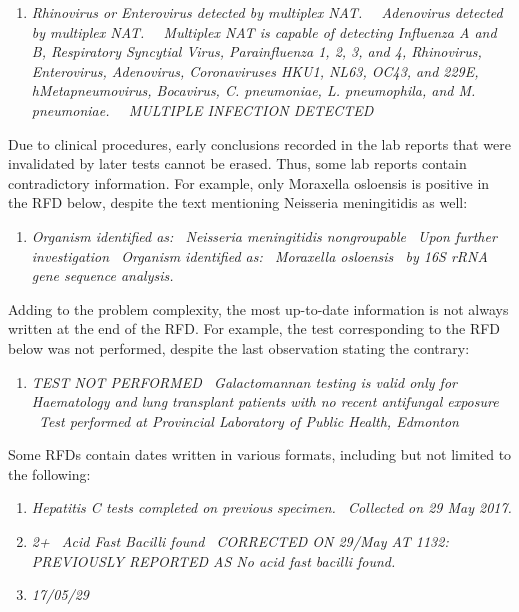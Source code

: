\documentclass[sigconf]{acmart}
\begin{document}
\begin{enumerate}[resume]
    \item \textit{Rhinovirus or Enterovirus detected by multiplex NAT. \textbar\ \textbar\ Adenovirus detected by multiplex NAT. \textbar\ \textbar\ Multiplex NAT is capable of detecting Influenza A and B, Respiratory Syncytial Virus, Parainfluenza 1, 2, 3, and 4, Rhinovirus, Enterovirus, Adenovirus, Coronaviruses HKU1, NL63, OC43, and 229E, hMetapneumovirus, Bocavirus, C. pneumoniae, L. pneumophila, and M. pneumoniae. \textbar\ \textbar\ MULTIPLE INFECTION DETECTED}
\end{enumerate}

Due to clinical procedures, early conclusions recorded in the lab reports that were invalidated by later tests cannot be erased. Thus, some lab reports contain contradictory information. For example, only Moraxella osloensis is positive in the RFD below, despite the text mentioning Neisseria meningitidis as well:

\begin{enumerate}[resume]
    \item \textit{Organism identified as: \textbar\ Neisseria meningitidis nongroupable \textbar\ Upon further investigation \textbar\ Organism identified as: \textbar\ Moraxella osloensis \textbar\ by 16S rRNA gene sequence analysis.}
\end{enumerate}

Adding to the problem complexity, the most up-to-date information is not always written at the end of the RFD. For example, the test corresponding to the RFD below was not performed, despite the last observation stating the contrary:

\begin{enumerate}[resume]
    \item \textit{TEST NOT PERFORMED \textbar\ Galactomannan testing is valid only for Haematology and lung transplant patients with no recent antifungal exposure \textbar\ Test performed at Provincial Laboratory of Public Health, Edmonton}
\end{enumerate}

Some RFDs contain dates written in various formats, including but not limited to the following:

\begin{enumerate}[resume]
    \item \textit{Hepatitis C tests completed on previous specimen. \textbar\ Collected on 29 May 2017.}
    \item \textit{2+ \textbar\ Acid Fast Bacilli found \textbar\ CORRECTED ON 29/May AT 1132: PREVIOUSLY REPORTED AS No acid fast bacilli found.}
    \item \textit{17/05/29}
\end{enumerate}
\end{document}

